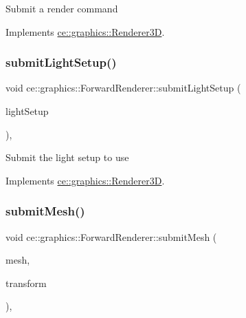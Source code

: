 Submit a render command 

Implements \hyperlink{classce_1_1graphics_1_1_renderer3_d_a67e956930a17600cdcfc689aa624f990}{ce\+::graphics\+::\+Renderer3D}.

\mbox{\label{classce_1_1graphics_1_1_forward_renderer_a32c92d13c2ba951f71552ea9cf15350c}} 
\subsubsection{\texorpdfstring{submit\+Light\+Setup()}{submitLightSetup()}}
{\footnotesize\ttfamily void ce\+::graphics\+::\+Forward\+Renderer\+::submit\+Light\+Setup (\begin{DoxyParamCaption}\item[{const \hyperlink{structce_1_1graphics_1_1_light_setup}{Light\+Setup} \&}]{light\+Setup }\end{DoxyParamCaption})\hspace{0.3cm}{\ttfamily [override]}, {\ttfamily [virtual]}}

Submit the light setup to use 

Implements \hyperlink{classce_1_1graphics_1_1_renderer3_d_a4a2eb6efe3adbff611c20141159eb3dc}{ce\+::graphics\+::\+Renderer3D}.

\mbox{\label{classce_1_1graphics_1_1_forward_renderer_abfb5f86e8b5c6a1824ab7a03838785fd}} 
\subsubsection{\texorpdfstring{submit\+Mesh()}{submitMesh()}}
{\footnotesize\ttfamily void ce\+::graphics\+::\+Forward\+Renderer\+::submit\+Mesh (\begin{DoxyParamCaption}\item[{\hyperlink{classce_1_1graphics_1_1_mesh}{Mesh} $\ast$}]{mesh,  }\item[{const glm\+::mat4 \&}]{transform }\end{DoxyParamCaption})\hspace{0.3cm}{\ttfamily [override]}, {\ttfamily [virtual]}}

